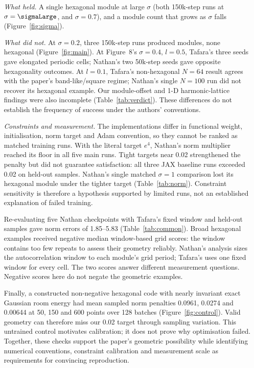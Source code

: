 \documentclass[10pt,letterpaper]{article}
\begin{document}
\emph{What held.} A single hexagonal module at large $\sigma$ (both 150k-step runs at $\sigma=\sigmaLarge$, and $\sigma=0.7$), and a module count that grows as $\sigma$ falls (Figure~\ref{fig:sigma}).

\emph{What did not.} At $\sigma=0.2$, three 150k-step runs produced \xMainLowTotalModules{} modules, none hexagonal (Figure~\ref{fig:main}). At Figure~8's $\sigma=0.4$, $l=0.5$, Tafara's three seeds gave elongated periodic cells; Nathan's two 50k-step seeds gave opposite hexagonality outcomes. At $l=0.1$, Tafara's non-hexagonal $N=64$ result agrees with the paper's band-like/square regime; Nathan's single $N=100$ run did not recover its hexagonal example. Our module-offset and 1-D harmonic-lattice findings were also incomplete (Table~\ref{tab:verdict}). These differences do not establish the frequency of success under the authors' conventions.

\emph{Constraints and measurement.} The implementations differ in functional weight, initialisation, norm target and Adam convention, so they cannot be ranked as matched training runs. With the literal target $e^4$, Nathan's norm multiplier reached its floor in all five main runs. Tight targets near 0.02 strengthened the penalty but did not guarantee satisfaction: all three JAX baseline runs exceeded 0.02 on held-out samples. Nathan's single matched $\sigma=1$ comparison lost its hexagonal module under the tighter target (Table~\ref{tab:norm}). Constraint sensitivity is therefore a hypothesis supported by limited runs, not an established explanation of failed training.

Re-evaluating five Nathan checkpoints with Tafara's fixed window and held-out samples gave norm errors of 1.85--5.83 (Table~\ref{tab:common}). Broad hexagonal examples received negative median window-based grid scores: the window contains too few repeats to assess their geometry reliably. Nathan's analysis sizes the autocorrelation window to each module's grid period; Tafara's uses one fixed window for every cell. The two scores answer different measurement questions. Negative scores here do not negate the geometric examples.

Finally, a constructed non-negative hexagonal code with nearly invariant exact Gaussian room energy had mean sampled norm penalties 0.0961, 0.0274 and 0.00644 at 50, 150 and 600 points over 128 batches (Figure~\ref{fig:control}). Valid geometry can therefore miss our 0.02 target through sampling variation. This untrained control motivates calibration; it does not prove why optimisation failed. Together, these checks support the paper's geometric possibility while identifying numerical conventions, constraint calibration and measurement scale as requirements for convincing reproduction.
\end{document}
